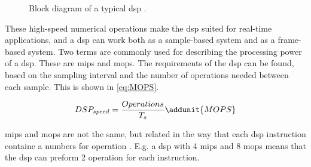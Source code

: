 \begin{figure}
\centering
\def\svgwidth{\columnwidth}

\caption{Block diagram of a typical \gls{dsp} \citep{AnalogDialogue}.}
		\label{fig:typ_dsp}
\end{figure}

These high-speed numerical operations make the \gls{dsp} suited for real-time applications, and a \gls{dsp} can work both as a sample-based system and as a frame-based system. 
Two terms are commonly used for describing the processing power of a \gls{dsp}. These are \gls{mips} and \gls{mops}. The requirements of the \gls{dsp} can be found, based on the sampling interval and the number of operations needed between each sample. This is shown in \eqref{eq:MOPS}.

\begin{equation}\label{eq:MOPS}
        DSP_{speed} = \frac{Operations}{T_s}\addunit{MOPS}
    \end{equation}

    \startexplain
    \stopexplain


\gls{mips} and \gls{mops} are not the same, but related in the way that each \gls{dsp} instruction containe a numbers for operation  \citep{AnalogDialogue}. E.g. a \gls{dsp} with 4 \gls{mips} and 8 \gls{mops} means that the \gls{dsp} can preform 2 operation for each instruction.


